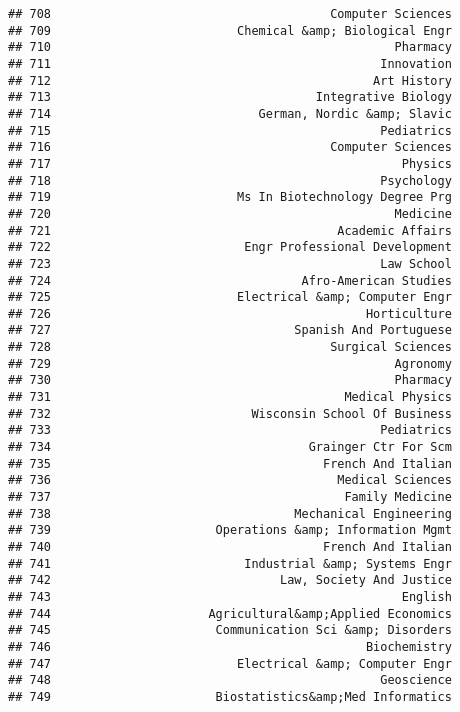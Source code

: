 \documentclass[
]{article}
\begin{document}
\begin{verbatim}
## 708                                       Computer Sciences
## 709                          Chemical &amp; Biological Engr
## 710                                                Pharmacy
## 711                                              Innovation
## 712                                             Art History
## 713                                     Integrative Biology
## 714                             German, Nordic &amp; Slavic
## 715                                              Pediatrics
## 716                                       Computer Sciences
## 717                                                 Physics
## 718                                              Psychology
## 719                          Ms In Biotechnology Degree Prg
## 720                                                Medicine
## 721                                        Academic Affairs
## 722                           Engr Professional Development
## 723                                              Law School
## 724                                   Afro-American Studies
## 725                          Electrical &amp; Computer Engr
## 726                                            Horticulture
## 727                                  Spanish And Portuguese
## 728                                       Surgical Sciences
## 729                                                Agronomy
## 730                                                Pharmacy
## 731                                         Medical Physics
## 732                            Wisconsin School Of Business
## 733                                              Pediatrics
## 734                                    Grainger Ctr For Scm
## 735                                      French And Italian
## 736                                        Medical Sciences
## 737                                         Family Medicine
## 738                                  Mechanical Engineering
## 739                       Operations &amp; Information Mgmt
## 740                                      French And Italian
## 741                           Industrial &amp; Systems Engr
## 742                                Law, Society And Justice
## 743                                                 English
## 744                      Agricultural&amp;Applied Economics
## 745                       Communication Sci &amp; Disorders
## 746                                            Biochemistry
## 747                          Electrical &amp; Computer Engr
## 748                                              Geoscience
## 749                       Biostatistics&amp;Med Informatics

\end{verbatim}
\end{document}
